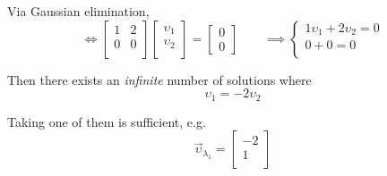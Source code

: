 \begin{remark}
\begin{enumerate}
            Via Gaussian elimination,
            \begin{equation}
                \Leftrightarrow 
                \begin{bmatrix}
                    1 & 2 \\
                    0 & 0 \\
                \end{bmatrix}
                \begin{bmatrix}
                    {\upsilon}_{1} \\
                    {\upsilon}_{2} \\
                \end{bmatrix}
                =
                \begin{bmatrix}
                    0 \\
                    0
                \end{bmatrix}
                \quad\quad \implies
                \left\{
                \begin{array}{l}
                    1 \upsilon_1 + 2 \upsilon_2 = 0 \\
                    0 + 0 = 0 \\
                \end{array}
                \right.
            \end{equation}
            
            Then there exists an \textit{infinite} number of solutions where
            \begin{equation}
                \upsilon_1 = -2 \upsilon_2
            \end{equation}
            
            Taking one of them is sufficient, e.g.
            \begin{equation}
                {\overrightarrow{\upsilon}}_{\lambda_1}
                = 
                \begin{bmatrix}
                    -2 \\
                    1  \\
                \end{bmatrix}
            \end{equation}
            

\end{enumerate}
\end{remark}
